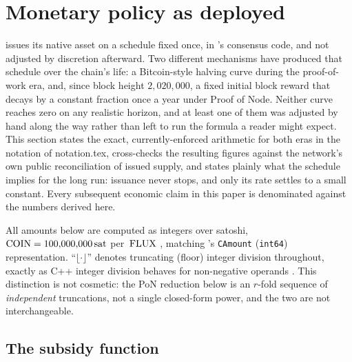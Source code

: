 \section{Monetary policy as deployed}
\label{sec:monetary-policy}

\Flux issues its native asset on a schedule fixed once, in \fluxd's consensus code, and not
adjusted by discretion afterward. Two different mechanisms have produced that schedule over the
chain's life: a Bitcoin-style halving curve during the proof-of-work era, and, since block height
$2{,}020{,}000$, a fixed initial block reward that decays by a constant fraction once a year under
Proof of Node. Neither curve reaches zero on any realistic horizon, and at least one of them was
adjusted by hand along the way rather than left to run the formula a reader might expect. This
section states the exact, currently-enforced arithmetic for both eras in the notation of
notation.tex, cross-checks the resulting figures against the network's own public reconciliation
of issued supply, and states plainly what the schedule implies for the long run: issuance never
stops, and only its rate settles to a small constant. Every subsequent economic claim in this
paper is denominated against the numbers derived here.

All amounts below are computed as integers over satoshi, $\mathrm{COIN} = 100{,}000{,}000\,\mathrm{sat}$ per
$\,\mathrm{FLUX}$ \shipped {}, matching \fluxd's \texttt{CAmount}
(\texttt{int64}) representation. ``$\lfloor\cdot\rfloor$'' denotes truncating (floor) integer
division throughout, exactly as C++ integer division behaves for non-negative operands
. This distinction is
not cosmetic: the PoN reduction below is an $r$-fold sequence of \emph{independent} truncations,
not a single closed-form power, and the two are not interchangeable.

\subsection{The subsidy function}

